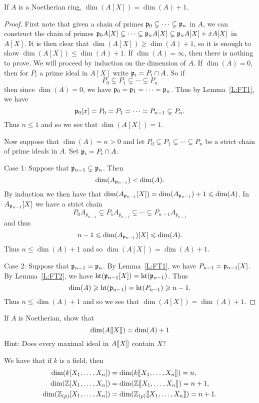 \documentclass{ximera}
\begin{document}
\begin{theorem}
  If $A$ is a Noetherian ring, $\dim(A[X]) = \dim(A) + 1$.
  \begin{proof}
    First note that given a chain of primes $\mathfrak{p}_0 \subsetneq \cdots
    \subsetneq \mathfrak{p}_n$ in $A$, we can construct the chain of primes
    $\mathfrak{p}_0 A[X] \subsetneq \cdots \subsetneq \mathfrak{p}_n A[X] \subsetneq \mathfrak{p}_n
    A[X] + x A[X]$ in $A[X]$.  It is then clear that $\dim(A[X]) \ge
    \dim(A) + 1$, so it is enough to show $\dim(A[X]) \le\dim(A) +
    1$. If $\dim(A) = \infty$, then there is nothing to prove. We will
    proceed by induction on the dimension of $A$. If $\dim(A) = 0$,
    then for $P_i$ a prime ideal in $A[X]$ write $\mathfrak{p}_i = P_i\cap A$.
    So if
    \[
    P_0\subsetneq P_1\subsetneq \cdots \subsetneq P_n
    \]
    then since $\dim(A) = 0$, we have $\mathfrak{p}_0 = \mathfrak{p}_1 = \cdots = \mathfrak{p}_n$. Thus by Lemma~\ref{L:FT1}, we have 
    \[
    \mathfrak{p}_0[x] = P_0 = P_1 = \cdots = P_{n-1}\subsetneq P_n.
    \]
    Thus $n\le 1$ and so we see that $\dim(A[X]) = 1$.
    
    Now suppose that $\dim(A) = n >0$ and let $P_0 \subsetneq P_1
    \subsetneq \cdots \subsetneq P_n$ be a strict chain of prime
    ideals in $A$.  Set $\mathfrak{p}_i = P_i \cap A$.
    
    Case 1: Suppose that $\mathfrak{p}_{n-1} \subsetneq \mathfrak{p}_n$. Then
    \[
    \dim(A_{\mathfrak{p}_{n-1}})< \dim(A).
    \]
    By induction we then have that $\dim(A_{\mathfrak{p}_{n-1}}[X]) =
    \dim(A_{\mathfrak{p}_{n-1}})+1\leqslant \dim(A)$. In $A_{\mathfrak{p}_{n-1}}[X]$ we have a
    strict chain
    \[
    P_0A_{p_{n-1}} \subsetneq P_1A_{p_{n-1}} \subsetneq \cdots \subsetneq P_{n-1}A_{p_{n-1}}
    \] 
    and thus 
    \[
    n-1 \leqslant \dim(A_{\mathfrak{p}_{n-1}})[X]\leqslant \dim(A). 
    \]
    Thus $n \le\dim(A) +1$ and so  $\dim(A[X]) = \dim(A) + 1$.
    
    Case 2: Suppose that $\mathfrak{p}_{n-1} = \mathfrak{p}_n$. By Lemma~\ref{L:FT1}, we
    have $P_{n-1} = \mathfrak{p}_{n-1}[X]$.  By Lemma~\ref{L:FT2}, we have
    $\operatorname{ht}(\mathfrak{p}_{n-1}[X])=\operatorname{ht}(\mathfrak{p}_{n-1})$.  Thus
    \[
    \dim(A) \geqslant \operatorname{ht}(\mathfrak{p}_{n-1}) = \operatorname{ht}(P_{n-1}) \geqslant n-1.
    \]
    Thus $n\le \dim(A) + 1$ and so we see that $\dim(A[X]) = \dim(A) +1$.
  \end{proof}
\end{theorem}


\begin{exercise} If $A$ is Noetherian, show that 
\[
\dim(A[\hspace{-0.25ex}[ X ]\hspace{-0.25ex}]) = \dim(A) + 1
\]
Hint: Does every maximal ideal in $A[\hspace{-0.25ex}[ X ]\hspace{-0.25ex}]$ contain $X$?
\end{exercise}


\begin{corollary} We have that if $k$ is a field, then
\begin{align*}
\dim(k[X_1,\ldots,X_n]) &= \dim(k[\hspace{-0.25ex}[ X_1,\dots,X_n]\hspace{-0.25ex}]) = n, \\
\dim(\mathbb Z[X_1,\ldots,X_n]) &= \dim(\mathbb Z[\hspace{-0.25ex}[ X_1,\dots,X_n]\hspace{-0.25ex}]) = n+1, \\
\dim(\mathbb Z_{(p)}[X_1,\ldots,X_n]) &= \dim(\mathbb Z_{(p)}[\hspace{-0.25ex}[ X_1,\dots,X_n]\hspace{-0.25ex}]) = n+1.
\end{align*}
\end{corollary}
\end{document}
